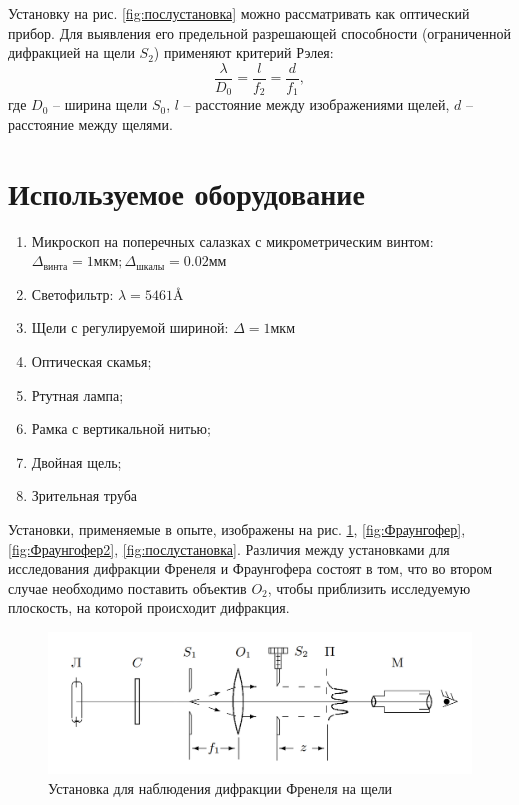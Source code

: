 \documentclass[a4paper, 12pt]{article}
\begin{document}
Установку на рис. \ref{fig:послустановка} можно рассматривать как оптический прибор. Для выявления его предельной разрешающей способности (ограниченной дифракцией на щели $ S_2 $) применяют критерий Рэлея:
\begin{equation}\label{eq:рэлей}
	\frac{\lambda}{D_0} = \frac{l}{f_2} = \frac{d}{f_1},
\end{equation}
где $ D_0 $ -- ширина щели $ S_0 $, $ l $ -- расстояние между изображениями щелей, $ d $ -- расстояние между щелями.

\section{Используемое оборудование}

\begin{enumerate}
    \item Микроскоп на поперечных салазках с микрометрическим винтом: \\ $ \Delta_{винта} = 1мкм; \Delta_{шкалы} = 0.02 мм $
    \item Светофильтр: $ \lambda = 5461\text{\AA}$
    \item Щели с регулируемой шириной: $ \Delta = 1 мкм $
    \item Оптическая скамья;
    \item Ртутная лампа; 
    \item Рамка с вертикальной нитью;
    \item Двойная щель;
    \item Зрительная труба
\end{enumerate}

Установки, применяемые в опыте, изображены на рис. \ref{fig:дифракцияФренеляУстановка}, \ref{fig:Фраунгофер}, \ref{fig:Фраунгофер2}, \ref{fig:послустановка}. Различия между установками для исследования дифракции Френеля и Фраунгофера состоят в том, что во втором случае необходимо поставить объектив $ O_2 $, чтобы приблизить исследуемую плоскость, на которой происходит дифракция.

\begin{figure}[h!]
	\centering
	\includegraphics[width=0.8\linewidth]{2.png}
	\caption{Установка для наблюдения дифракции Френеля на щели}
	\label{fig:дифракцияФренеляУстановка}
\end{figure}
\end{document}
